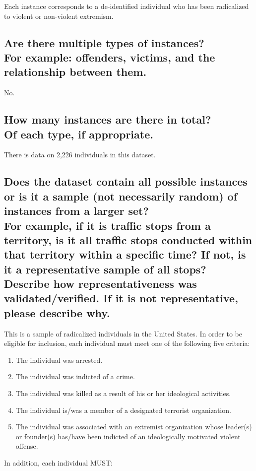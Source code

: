 \documentclass[letterpaper, 10 pt, conference]{ieeeconf}  %
\newcommand{\subtitle}[1]{{\\ \small \normalfont \color{purple} #1}}
\begin{document}
Each instance corresponds to a de-identified individual who has been radicalized to violent or non-violent extremism.

\subsection{Are there multiple types of instances? \subtitle{For example: offenders, victims, and the relationship between them.}}

No.

\subsection{How many instances are there in total? \subtitle{Of each type, if appropriate.}}

There is data on 2,226 individuals in this dataset.

\subsection{Does the dataset contain all possible instances or is it a sample (not necessarily random) of instances from a larger set? \subtitle{For example, if it is traffic stops from a territory, is it all traffic stops conducted within that territory within a specific time? If not, is it a representative sample of all stops? Describe how representativeness was validated/verified. If it is not representative, please describe why.}}

This is a sample of radicalized individuals in the United States. In order to be eligible for inclusion, each individual must meet one of the following five criteria:

\begin{enumerate}
    \item The individual was arrested.
    \item The individual was indicted of a crime.
    \item The individual was killed as a result of his or her ideological activities.
    \item The individual is/was a member of a designated terrorist organization.
    \item The individual was associated with an extremist organization whose leader(s) or founder(s) has/have been indicted of an ideologically motivated violent offense.
\end{enumerate}

In addition, each individual MUST:
\end{document}
